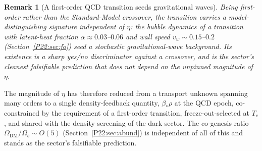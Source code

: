 \documentclass[11pt,a4paper]{article}
\newtheorem{remark}[theorem]{Remark}
\theoremstyle{definition}\newtheorem{definition}[theorem]{Definition}
\newcommand{\Odm}{\Omega_{\mathrm{DM}}}
\newcommand{\Ob}{\Omega_{b}}
\begin{document}
\begin{remark}[A first-order QCD transition seeds gravitational waves]
\label{P22:rem:gw}
Being first-order rather than the Standard-Model crossover, the transition carries a
model-distinguishing signature independent of $\eta$: the bubble dynamics of a transition with
latent-heat fraction $\alpha\approx0.03$--$0.06$ and wall speed $v_w\sim0.15$--$0.2$
(Section~\ref{P22:sec:fo}) seed a stochastic gravitational-wave background. Its existence is a sharp
yes/no discriminator against a crossover, and is the sector's cleanest falsifiable prediction that
does not depend on the unpinned magnitude of $\eta$.
\end{remark}

The magnitude of $\eta$ has therefore reduced from a transport unknown spanning many orders to a
single density-feedback quantity, $\beta_*\rho$ at the QCD epoch, co-constrained by the requirement
of a first-order transition, freeze-out-selected at $T_c$, and shared with the density screening of
the dark sector.
The co-genesis ratio $\Odm/\Ob\sim O(5)$ (Section~\ref{P22:sec:abund}) is
independent of all of this and stands as the sector's falsifiable prediction.
\end{document}
